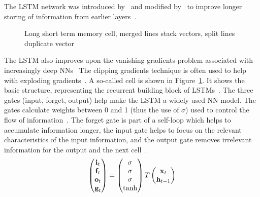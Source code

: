 The \ac{LSTM} network was introduced by~\cite{hochreiter_long_1997} and modified
by~\cite{gers_learning_1999} to improve longer storing of information from earlier
layers~\citep{chauhan_review_2018}.
\begin{figure}[ht]
    \centering
    
    \caption[Long short term memoory cell]{%
        Long short term memory cell, merged lines stack vectors, split lines duplicate
        vector~\citep{goodfellow_deep_2016,yu_review_2019}\label{fig:lstm}
    }
\end{figure}
The \ac{LSTM} also improves upon the vanishing gradients problem associated with
increasingly deep \acp{NN}~\citep{sherstinsky_fundamentals_2020}
The clipping gradients technique is often used to help with exploding
gradients~\citep{goodfellow_deep_2016}.
A so-called cell is shown in Figure~\ref{fig:lstm}.
It shows the basic structure, representing the recurrent building block of
\acp{LSTM}~\citep{goodfellow_deep_2016}.
The three gates (input, forget, output) help make the \ac{LSTM} a widely used \ac{NN} model.
The gates calculate weights between 0 and 1 (thus the use of $\sigma$) used to control
the flow of information~\citep{goodfellow_deep_2016}.
The forget gate is part of a self-loop which helps to accumulate information longer, the input
gate helps to focus on the relevant characteristics of the input information,
and the output gate removes irrelevant information for the output and the next
cell~\citep{goodfellow_deep_2016}.
\begin{equation}\label{eq:lstm-gates}
    \begin{pmatrix}
        \textbf{i}_t \\
        \textbf{f}_t \\
        \textbf{o}_t \\
        \textbf{g}_t
    \end{pmatrix}
    =
    \begin{pmatrix}
        \sigma \\
        \sigma \\
        \sigma \\
        \tanh
    \end{pmatrix}
    T
    \begin{pmatrix}
        \textbf{x}_{t} \\
        \textbf{h}_{t-1}
    \end{pmatrix}
\end{equation}
